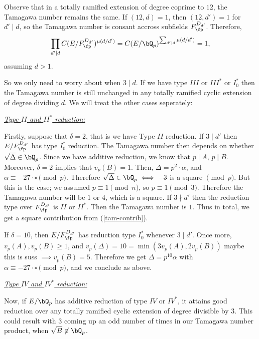 Observe that in a totally ramified extension of degree coprime to $12$, the Tamagawa number remains the same. If $(12, d) = 1$, then $(12, d') = 1$ for $d' \mid  d$, so the Tamagawa number is consant accross subfields $F_{\fp}^{D_{d'}}$. Therefore,
\[\prod_{d ' \mid d} C(E / F_{\fp}^{D_{d'}})^{\mu(d / d')} = C(E / \bQ_p)^{\sum_{d' \mid d} \mu(d / d')} = 1,\]
assuming $d > 1$. 

So we only need to worry about when $3 \mid d$. If we have type $III$ or $III^*$ or $I_0^*$ then the Tamagawa number is still unchanged in any totally ramified cyclic extension of degree dividing $d$. We will treat the other cases seperately: 

\vspace{1em}

\noindent\underline{\textit{Type $II$ and $II^*$ reduction:}}

Firstly, suppose that $\delta = 2$, that is we have Type $II$ reduction. If $3 \mid d'$ then $E / F_{\fp}^{D_{d'}}$ has type $I_0^*$ reduction. The Tamagawa number then depends on whether $\sqrt{\Delta} \in \bQ_p$. Since we have additive reduction, we know that $p \mid A$, $p \mid B$. Moreover, $\delta = 2$ implies that $v_p(B) = 1$. Then, $\Delta = p^2\cdot \alpha$, and $\alpha \equiv -27\cdot\square \pmod p$. Therefore $\sqrt{\Delta} \in \bQ_p \iff -3$ is a square $\pmod p$. But this is the case; we assumed $p \equiv 1 \pmod n$, so $p \equiv 1 \pmod 3$. Therefore the Tamagawa number will be $1$ or $4$, which is a square.
If $3 \nmid d'$ then the reduction type over $ F_{\fp}^{D_{d'}}$ is $II$ or $II^*$. Then the Tamagawa number is $1$. Thus in total, we get a square contribution from (\ref{tam-contrib}).

If $\delta = 10$, then $E / F_{\fp}^{D_{d'}}$ has reduction type $I_0^*$ whenever $3 \mid d'$. Once more, $v_p(A), v_p(B) \geq 1$, and $v_p(\Delta) = 10 = \min(3 v_p(A), 2 v_p(B))$ {\color{red} maybe this is suss} $\implies v_p(B) = 5$. Therefore we get $\Delta = p^{10} \alpha$ with $\alpha \equiv -27\cdot\square \pmod p$, and we conclude as above.

\vspace{1em}

\noindent\underline{\textit{Type $IV$ and $IV^*$ reduction:}}

Now, if $E /\bQ_p$ has additive reduction of type $IV$ or $IV^*$, it attains good reduction over any totally ramified cyclic extension of degree divisible by $3$. This could result with $3$ coming up an odd number of times in our Tamagawa number product, when $\sqrt{B} \not\in \bQ_p$. 

